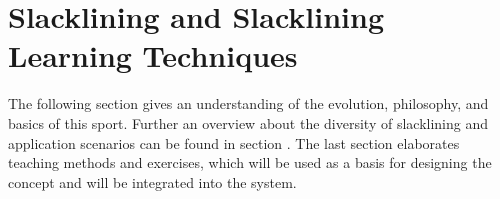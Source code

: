 \chapter{Slacklining  and Slacklining Learning Techniques}\label{3_slacklining}
The following section \textit{} gives an understanding of the evolution, philosophy, and basics of this sport. Further an overview about the diversity of slacklining and application scenarios can be found in section \textit{}. The last section \textit{} elaborates teaching methods and exercises, which will be used as a basis for designing the concept and will be integrated into the system.
 
  
  
 
  